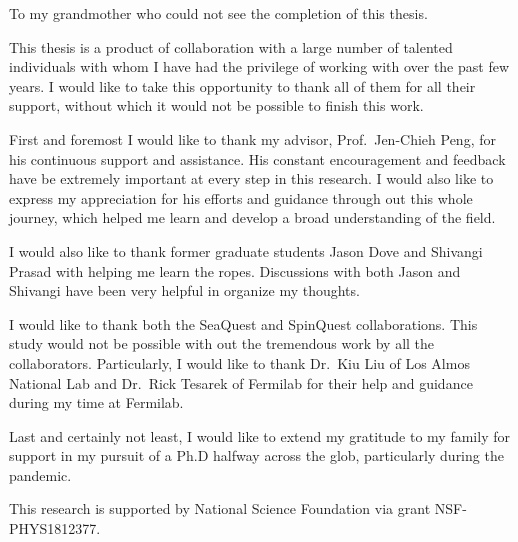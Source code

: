 \documentclass[../main.tex]{subfiles}
\begin{document}
\begin{dedication}
	To my grandmother who could not see the completion of this thesis.
\end{dedication}

\begin{acknowledgments}
	This thesis is a product of collaboration with a large number of talented
	individuals with whom I have had the privilege of working with over the past
	few years. I would like to take this opportunity to thank all of them for all
	their support, without which it would not be possible to finish this work.

	First and foremost I would like to thank my advisor, Prof.~Jen-Chieh Peng, for
	his continuous support and assistance. His constant encouragement and feedback
	have be extremely important at every step in this research. 
	I would also like to express my	appreciation for his efforts and guidance 
	through out this whole journey, which helped me learn and develop a broad
	understanding of the field.

	I would also like to thank former graduate students Jason Dove and Shivangi
	Prasad with helping me learn the ropes. Discussions with both Jason and
	Shivangi have been very helpful in organize my thoughts.

	I would like to thank both the SeaQuest and SpinQuest collaborations.
	This study would not be possible with out the tremendous work by all the
	collaborators. Particularly, I would like to thank Dr.~Kiu Liu of Los Almos
	National Lab and Dr.~Rick Tesarek of Fermilab for their help and guidance during
	my time at Fermilab.

	Last and certainly not least, I would like to extend my gratitude to my family
	for support in my pursuit of a Ph.D halfway across the glob, particularly
	during the pandemic.

	This research is supported by National Science Foundation via grant NSF-PHYS1812377.

\end{acknowledgments}
\end{document}
